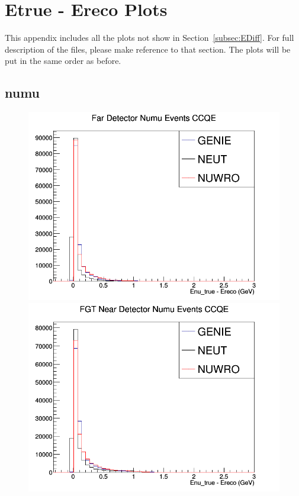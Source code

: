\section{Etrue - Ereco Plots}
\label{app:Ereco_app}
This appendix includes all the plots not show in Section~\ref{subsec:EDiff}. For full description of the files, please make reference to that section. The plots will be put in the same order as before.
\subsection{numu}
\begin{figure}[h]
\includegraphics[width=\linewidth]{Ereco_Etrue/numu_FD_CCQE.png}
\endminipage
{}
\includegraphics[width=\linewidth]{Ereco_Etrue/numu_FGT_CCQE.png}

\end{figure}

